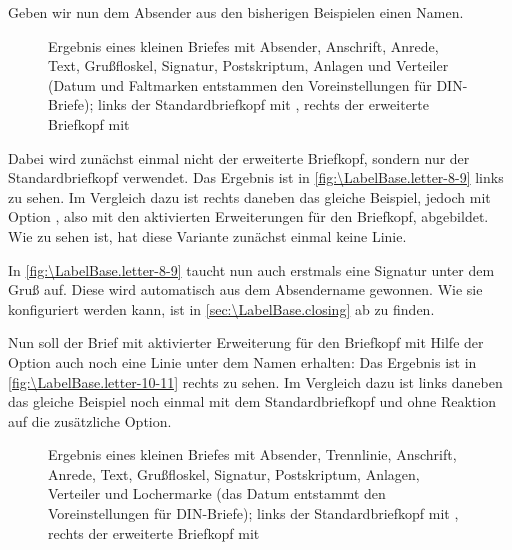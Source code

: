 \begin{Example}
  Geben wir nun dem Absender 
  \iftrue %
  aus den bisherigen Beispielen 
  \fi %
  einen Namen.
  \begin{figure}
    \centering
    \quad
    \caption[{Beispiel: Brief mit Absender, Anschrift, Anrede,
      Text, Grußfloskel, Signatur, Postskriptum, Anlagen und Verteiler}]
    {Ergebnis eines kleinen Briefes mit Absender, Anschrift, Anrede, Text,
      Grußfloskel, Signatur, Postskriptum, Anlagen und Verteiler (Datum und
      Faltmarken entstammen den Voreinstellungen für DIN-Briefe); links der
      Standardbriefkopf mit ,
      rechts der
      erweiterte Briefkopf mit }
    \label{fig:\LabelBase.letter-8-9}
  \end{figure}
  Dabei wird zunächst einmal nicht der erweiterte Briefkopf, sondern nur der
  Standardbriefkopf verwendet. Das Ergebnis ist in
  \autoref{fig:\LabelBase.letter-8-9} links zu sehen.  Im Vergleich dazu ist
  rechts daneben das gleiche Beispiel, jedoch mit Option
  , also mit den aktivierten
  Erweiterungen für den Briefkopf, abgebildet. Wie zu sehen ist, hat diese
  Variante zunächst einmal keine Linie. 

  In \autoref{fig:\LabelBase.letter-8-9} taucht nun auch erstmals eine Signatur
  unter dem Gruß auf. Diese wird automatisch aus dem Absendername
  gewonnen. Wie sie konfiguriert werden kann, ist in
  \autoref{sec:\LabelBase.closing} ab  zu
  finden.

  Nun soll der Brief mit aktivierter Erweiterung für den Briefkopf mit Hilfe
  der Option  auch noch eine Linie unter dem Namen erhalten:%
  Das Ergebnis ist in \autoref{fig:\LabelBase.letter-10-11} rechts zu sehen. %
  \iftrue %
  Im Vergleich dazu ist links daneben das gleiche Beispiel noch einmal mit dem
  Standardbriefkopf und ohne Reaktion auf die zusätzliche Option.
  \else %
  Links steht zum Vergleich ein Beispiel mit Standardbriefkopf.
  \fi 
  \begin{figure}
    \centering
    \quad
    \caption[{Beispiel: Brief mit Absender, Trennlinie, Anschrift, Anrede, Text,
      Grußfloskel, Signatur, Postskriptum, Anlagen, Verteiler und
      Lochermarke}]{Ergebnis eines kleinen Briefes mit Absender, Trennlinie,
      Anschrift, Anrede, Text, Grußfloskel, Signatur, Postskriptum, Anlagen,
      Verteiler und Lochermarke (das Datum entstammt den Voreinstellungen für
      DIN-Briefe); links der Standardbriefkopf mit
      , rechts der erweiterte
      Briefkopf mit }
    \label{fig:\LabelBase.letter-10-11}
  \end{figure}
\end{Example}

